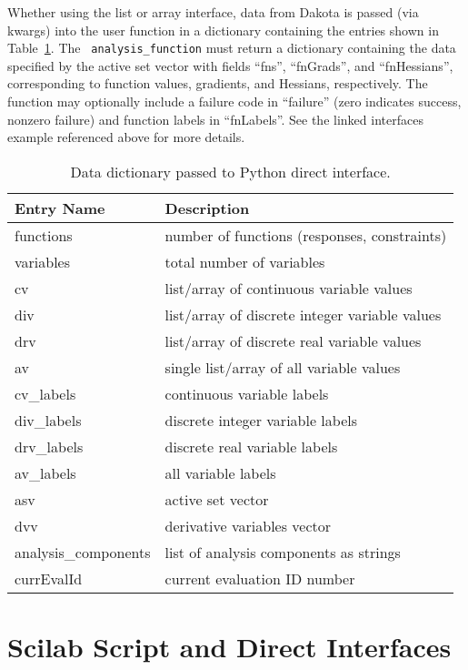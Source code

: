 Whether using the list or array interface, data from Dakota is passed
(via kwargs) into the user function in a dictionary containing the
entries shown in Table~\ref{advint:table:pythonparams}. The {\tt
analysis\_function} must return a dictionary containing the data
specified by the active set vector with fields ``fns'', ``fnGrads'',
and ``fnHessians'', corresponding to function values, gradients, and
Hessians, respectively. The function may optionally include a failure
code in ``failure'' (zero indicates success, nonzero failure) and
function labels in ``fnLabels''. See the linked interfaces example
referenced above for more details.

\begin{table}
\centering
\caption{Data dictionary passed to Python direct interface.}
\label{advint:table:pythonparams}\vspace{2mm}
\begin{tabular}{|l|l|}
\hline
\textbf{Entry Name} & \textbf{Description}  \\
\hline
functions  & number of functions (responses, constraints) \\
variables  & total number of variables \\
cv         & list/array of continuous variable values \\
div        & list/array of discrete integer variable values \\
drv        & list/array of discrete real variable values \\
av         & single list/array of all variable values \\
cv\_labels  & continuous variable labels \\
div\_labels & discrete integer variable labels \\
drv\_labels & discrete real variable labels \\
av\_labels  & all variable labels \\
asv        & active set vector \\
dvv        & derivative variables vector \\
analysis\_components & list of analysis components as strings \\
currEvalId & current evaluation ID number \\
\hline
\end{tabular}
\end{table}

\section{Scilab Script and Direct Interfaces}\label{scilab}

